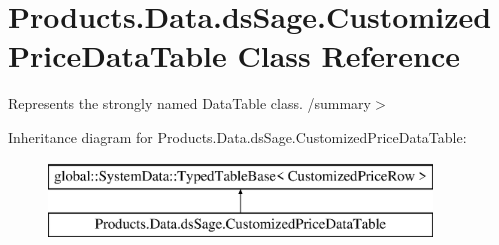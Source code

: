 \hypertarget{class_products_1_1_data_1_1ds_sage_1_1_customized_price_data_table}{}\section{Products.\+Data.\+ds\+Sage.\+Customized\+Price\+Data\+Table Class Reference}
\label{class_products_1_1_data_1_1ds_sage_1_1_customized_price_data_table}


Represents the strongly named Data\+Table class. /summary$>$  


Inheritance diagram for Products.\+Data.\+ds\+Sage.\+Customized\+Price\+Data\+Table\+:\begin{figure}[H]
\begin{center}
\leavevmode
\includegraphics[height=2.000000cm]{class_products_1_1_data_1_1ds_sage_1_1_customized_price_data_table}
\end{center}
\end{figure}
